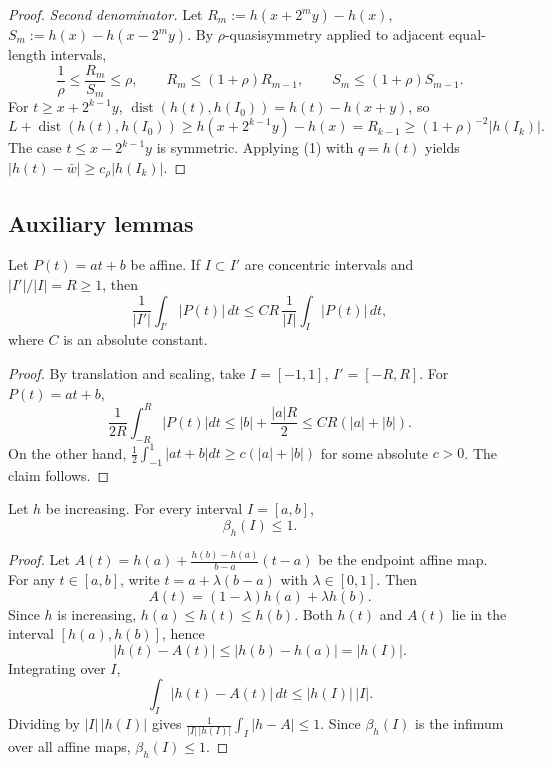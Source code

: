 \begin{proof}
	\medskip\noindent\textit{Second denominator.}
	Let $R_m:=h(x+2^my)-h(x)$, $S_m:=h(x)-h(x-2^my)$. By $\rho$-quasisymmetry applied to adjacent equal-length intervals,
	\[
	\frac1\rho\le\frac{R_m}{S_m}\le\rho,\qquad
	R_m\le(1+\rho)R_{m-1},\qquad
	S_m\le(1+\rho)S_{m-1}.
	\]
	For $t\ge x+2^{k-1}y$, $\operatorname{dist}(h(t),h(I_0))=h(t)-h(x+y)$, so
	\[
	L+\operatorname{dist}(h(t),h(I_0))\ge h(x+2^{k-1}y)-h(x)=R_{k-1}\ge (1+\rho)^{-2}|h(I_k)|.
	\]
	The case $t\le x-2^{k-1}y$ is symmetric. Applying (1) with $q=h(t)$ yields $|h(t)-\bar w|\ge c_\rho|h(I_k)|$.
\end{proof}

\subsection{Auxiliary lemmas}

\begin{lemma}\label{lem:affine-growth}
	\leanok
	Let $P(t)=at+b$ be affine. If $I\subset I'$ are concentric intervals and $|I'|/|I|=R\ge1$, then
	\[
	\frac1{|I'|}\int_{I'}|P(t)|\,dt\le C R\,\frac1{|I|}\int_I|P(t)|\,dt,
	\]
	where $C$ is an absolute constant.
\end{lemma}

\begin{proof}
	By translation and scaling, take $I=[-1,1]$, $I'=[-R,R]$. For $P(t)=at+b$,
	\[
	\frac1{2R}\int_{-R}^{R}|P(t)|dt\le|b|+\frac{|a|R}{2}\le C R(|a|+|b|).
	\]
	On the other hand, $\frac12\int_{-1}^{1}|at+b|dt\ge c(|a|+|b|)$ for some absolute $c>0$. The claim follows.
\end{proof}

\begin{lemma}\label{lem:crude-beta}
	\leanok
	Let $h$ be increasing. For every interval $I=[a,b]$,
	\[
	\beta_h(I)\le 1.
	\]
\end{lemma}

\begin{proof}
	Let $A(t)=h(a)+\frac{h(b)-h(a)}{b-a}(t-a)$ be the endpoint affine map.
	For any $t\in[a,b]$, write $t=a+\lambda(b-a)$ with $\lambda\in[0,1]$. Then
	\[
	A(t)=(1-\lambda)h(a)+\lambda h(b).
	\]
	Since $h$ is increasing, $h(a)\le h(t)\le h(b)$. Both $h(t)$ and $A(t)$ lie
	in the interval $[h(a),h(b)]$, hence
	\[
	|h(t)-A(t)|\le|h(b)-h(a)|=|h(I)|.
	\]
	Integrating over $I$,
	\[
	\int_I|h(t)-A(t)|\,dt\le|h(I)|\,|I|.
	\]
	Dividing by $|I|\,|h(I)|$ gives $\frac{1}{|I|\,|h(I)|}\int_I|h-A|\le 1$.
	Since $\beta_h(I)$ is the infimum over all affine maps, $\beta_h(I)\le 1$.
\end{proof}

